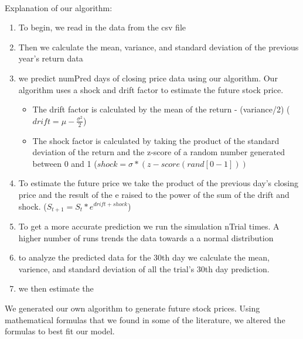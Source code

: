 \documentclass{article}
\begin{document}
\\
Explanation of our algorithm:
\begin{enumerate}
\item To begin, we read in the data from the csv file
\item Then we calculate the mean, variance, and standard deviation of the previous year's return data
\item we predict numPred days of closing price data using our algorithm. Our algorithm uses a shock and drift factor to estimate the future stock price.
\begin{itemize}
\item  The drift factor is calculated by the mean of the return - (variance/2) ($drift = \mu - \frac{\sigma^2}{2}$)
\item The shock factor is calculated by taking the product of the standard deviation of the return and the z-score of a random number generated between 0 and 1 ($shock = \sigma*(z-score(rand[0-1]))$
\end{itemize}
\item To estimate the future price we take the product of the previous day's closing price and the result of the e raised to the power of the sum of the drift and shock. ($S_{t+1} = S_t*e^{drift + shock}$)
\item To get a more accurate prediction we run the simulation nTrial times. A higher number of runs trends the data towards a a normal distribution
\item to analyze the predicted data for the 30th day we calculate the mean, varience, and standard deviation of all the trial's 30th day prediction.
\item we then estimate the 
\end{enumerate}
\text We generated our own algorithm to generate future stock prices. Using mathematical formulas that we found in some of the literature, we altered the formulas to best fit our model. 
\end{document}
